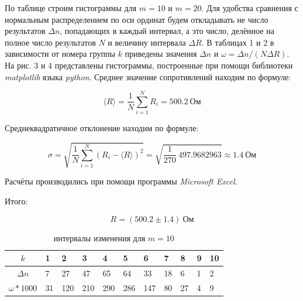\documentclass[a4paper, 12pt]{article}
\begin{document}
    По таблице строим гистограммы для $m = 10$ и $m = 20$. Для удобства сравнения с нормальным распределением по оси ординат будем откладывать не число результатов $\Delta n$, попадающих в каждый интервал, а это число, делённое на полное число результатов $N$ и величину интервала $\Delta R$. В таблицах 1 и 2 в зависимости от номера группы $k$ приведены значения $\Delta n$ и $\omega = \Delta n / (N \Delta R)$. На рис. 3 и 4 представлены гистограммы, построенные при помощи библиотеки \textit{matplotlib} языка \textit{python}. Среднее значение сопротивлений находим по формуле:

    \begin{equation}
        \langle R \rangle = \frac{1}{N} \sum_{i=1}^{N} R_i = 500.2\ Ом
    \end{equation}

    Среднеквадратичное отклонение находим по формуле:

    \begin{equation}
        \sigma = \sqrt{\frac{1}{N} \sum_{i=1}^{N}(R_i - \langle R \rangle)^2} = \sqrt{\frac{1}{270}\ 497.9682963} \approx 1.4\ Ом
    \end{equation}

    Расчёты производились при помощи программы \textit{Microsoft Excel}.

    Итого:

    \begin{equation*}
        R = (500.2 \pm 1.4)\ Ом
    \end{equation*}

    \begin{table}[!htbp]
        \centering
        \caption{интервалы изменения для $m = 10$}
        \begin{tabular}{|c|m{1.5em}|m{1.5em}|m{1.5em}|m{1.5em}|m{1.5em}|m{1.5em}|m{1.5em}|m{1.5em}|m{1.5em}|m{1.5em}|}
            \hline
            $k$ & 1 & 2 & 3 & 4 & 5 & 6 & 7 & 8 & 9 & 10 \\
            \hline
            $\Delta n$ & 7 & 27 & 47 & 65 & 64 & 33 & 18 & 6 & 1 & 2 \\
            \hline
            $\omega * 1000$ & 31 & 120 & 210 & 290 & 286 & 147 & 80 & 27 & 4 & 9 \\
            \hline
        \end{tabular}
    \end{table}
\end{document}
